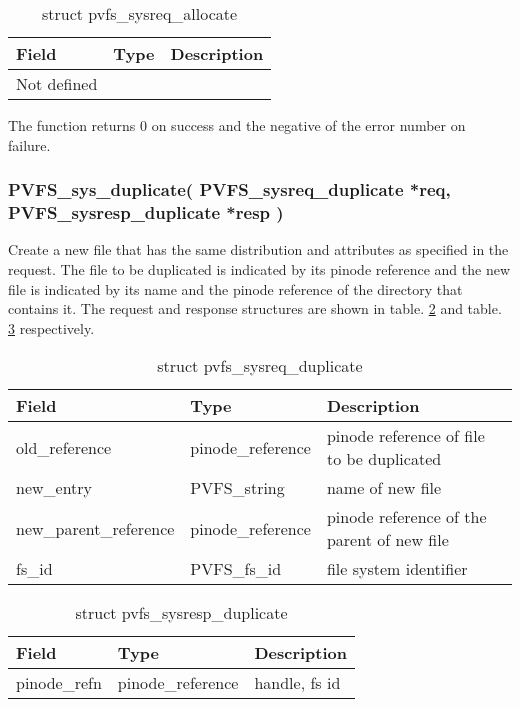 \documentclass[11pt, letterpaper]{article}
\begin{document}
\begin{table}[H]
\begin{tabular}{|l|l|l|}
\hline
Field & Type & Description \\
\hline
\hline
Not defined & & \\
\hline
\end{tabular}
\caption{struct pvfs\_sysreq\_allocate}\label{tab:reqalloc}
\end{table}

The function returns 0 on success and the negative of the error
number on failure.

\subsubsection{PVFS\_sys\_duplicate(
PVFS\_sysreq\_duplicate *req,
PVFS\_sysresp\_duplicate *resp
)}

Create a new file that has the same distribution and attributes as
specified in the request. The file to be duplicated is indicated by its
pinode reference and the new file is indicated by its name and the
pinode reference of the directory that contains it. The request and
response structures are shown in table. \ref{tab:reqdup} and table.
\ref{tab:respdup} respectively.

\begin{table}[H]
\begin{tabular}{|l|l|l|}
\hline
Field & Type & Description \\
\hline
\hline
old\_reference & pinode\_reference & pinode reference of file to be
duplicated \\
\hline
new\_entry & PVFS\_string & name of new file \\
\hline
new\_parent\_reference & pinode\_reference & pinode reference of the
parent of new file \\
\hline
fs\_id & PVFS\_fs\_id & file system identifier \\
\hline
\end{tabular}
\caption{struct pvfs\_sysreq\_duplicate}\label{tab:reqdup}
\end{table}

\begin{table}[H]
\begin{tabular}{|l|l|l|}
\hline
Field & Type & Description \\
\hline
\hline
pinode\_refn & pinode\_reference & handle, fs id \\
\hline
\end{tabular}
\caption{struct pvfs\_sysresp\_duplicate}\label{tab:respdup}
\end{table}
\end{document}

